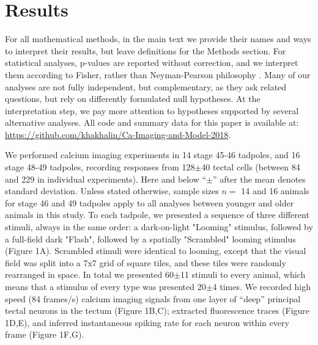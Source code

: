 \documentclass{article}
\begin{document}
\section*{Results}

For all mathematical methods, in the main text we provide their names and ways to interpret their results, but leave definitions for the Methods section. For statistical analyses, p-values are reported without correction, and we interpret them according to Fisher, rather than Neyman-Pearson philosophy \citep{greenland2016}. Many of our analyses are not fully independent, but complementary, as they ask related questions, but rely on differently formulated null hypotheses. At the interpretation step, we pay more attention to hypotheses supported by several alternative analyses. All code and summary data for this paper is available at:  \url{https://github.com/khakhalin/Ca-Imaging-and-Model-2018}.


We performed calcium imaging experiments in 14 stage 45-46 tadpoles, and 16 stage 48-49 tadpoles, recording responses from 128$\pm$40 tectal cells (between 84 and 229 in individual experiments). Here and below “$\pm$” after the mean denotes standard deviation. Unless stated otherwise, sample sizes $n=$ 14 and 16 animals for stage 46 and 49 tadpoles apply to all analyses between younger and older animals in this study. To each tadpole, we presented a sequence of three different stimuli, always in the same order: a dark-on-light "Looming" stimulus, followed by a full-field dark "Flash", followed by a spatially "Scrambled" looming stimulus (Figure 1A). Scrambled stimuli were identical to looming, except that the visual field was split into a 7x7 grid of square tiles, and these tiles were randomly rearranged in space. In total we presented 60$\pm$11 stimuli to every animal, which means that a stimulus of every type was presented 20$\pm$4 times. We recorded high speed (84 frames/s) calcium imaging signals \citep{xu2011, truszkowski2017} from one layer of “deep” principal tectal neurons in the tectum (Figure 1B,C); extracted fluorescence traces (Figure 1D,E), and inferred instantaneous spiking rate for each neuron within every frame (Figure 1F,G).
\end{document}
